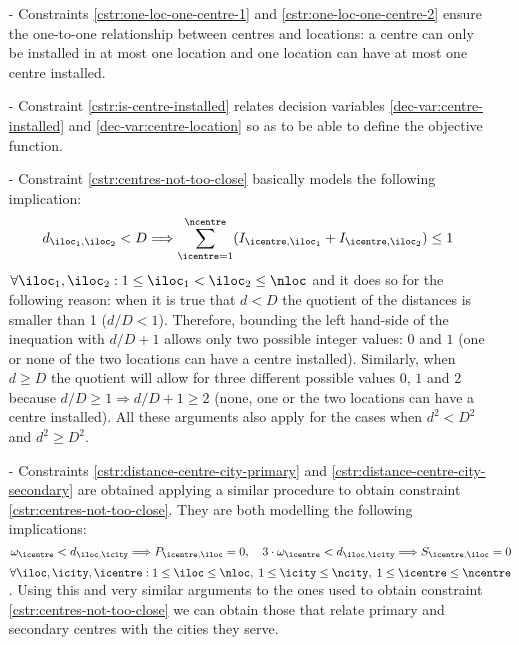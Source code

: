 \begin{itemize}
    
    \item[-] Constraints \ref{cstr:one-loc-one-centre-1} and \ref{cstr:one-loc-one-centre-2} ensure the
    one-to-one relationship between centres and locations: a centre can only be installed in at most one
    location and one location can have at most one centre installed.
    
    \item[-] Constraint \ref{cstr:is-centre-installed} relates decision variables 
    \ref{dec-var:centre-installed} and \ref{dec-var:centre-location} so as to be able to define the
    objective function.
    
    \item[-] Constraint \ref{cstr:centres-not-too-close} basically models the following implication:
    \[
    d_{\iloc_1, \iloc_2} < D
    \Longrightarrow
    \sum_{\icentre = 1}^{\ncentre} ( I_{\icentre, \iloc_1} + I_{\icentre, \iloc_2} ) \le 1
    \]
    $\forall \iloc_1, \iloc_2: 1 \le \iloc_1 < \iloc_2 \le \nloc$
    and it does so for the following reason: when it is true that $d < D$ the quotient of the
    distances is smaller than 1 ($d / D < 1$). Therefore, bounding the left hand-side of the
    inequation with $d / D + 1$ allows only two possible integer values: $0$ and $1$ (one or
    none of the two locations can have a centre installed). Similarly, when $d \ge D$ the
    quotient will allow for three different possible values $0$, $1$ and $2$ because
    $d / D \ge 1 \Longrightarrow d / D + 1 \ge 2$ (none, one or the two locations can have a
    centre installed). All these arguments also apply for the cases when $d^2 < D^2$ and
    $d^2 \ge D^2$.
    
    \item[-] Constraints \ref{cstr:distance-centre-city-primary} and 
    \ref{cstr:distance-centre-city-secondary} are obtained applying a similar procedure to obtain
    constraint \ref{cstr:centres-not-too-close}. They are both modelling the following implications:
    \[
    \omega_{\icentre} < d_{\iloc, \icity} \Longrightarrow P_{\icentre, \iloc} = 0,
    \quad
    3 \cdot \omega_{\icentre} < d_{\iloc, \icity} \Longrightarrow S_{\icentre, \iloc} = 0
    \]
    $\forall \iloc, \icity, \icentre: 1 \le \iloc \le \nloc,\; 1 \le \icity \le \ncity,\;
    1 \le \icentre \le \ncentre$. Using this and very similar arguments to the ones used to obtain
    constraint \ref{cstr:centres-not-too-close} we can obtain those that relate primary and secondary
    centres with the cities they serve.
    
\end{itemize}

